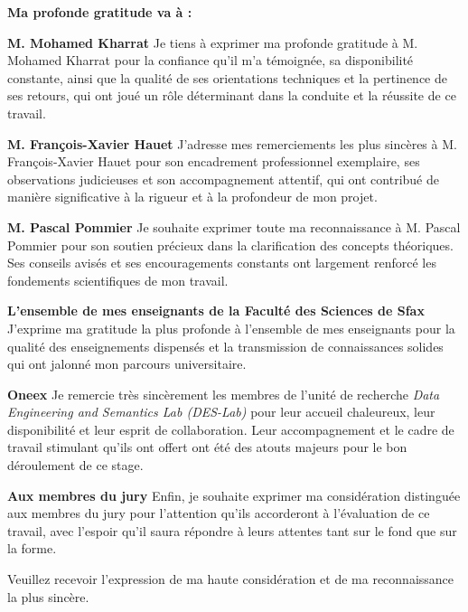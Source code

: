 \textbf{Ma profonde gratitude va à :}

\medskip

\textbf{M. Mohamed Kharrat}
Je tiens à exprimer ma profonde gratitude à M. Mohamed Kharrat pour la confiance qu’il m’a témoignée, sa disponibilité constante, ainsi que la qualité de ses orientations techniques et la pertinence de ses retours, qui ont joué un rôle déterminant dans la conduite et la réussite de ce travail.

\medskip

\textbf{M. François-Xavier Hauet}
J’adresse mes remerciements les plus sincères à M. François-Xavier Hauet pour son encadrement professionnel exemplaire, ses observations judicieuses et son accompagnement attentif, qui ont contribué de manière significative à la rigueur et à la profondeur de mon projet.

\medskip

\textbf{M. Pascal Pommier}
Je souhaite exprimer toute ma reconnaissance à M. Pascal Pommier pour son soutien précieux dans la clarification des concepts théoriques. Ses conseils avisés et ses encouragements constants ont largement renforcé les fondements scientifiques de mon travail.

\medskip

\textbf{L’ensemble de mes enseignants de la Faculté des Sciences de Sfax}
J’exprime ma gratitude la plus profonde à l’ensemble de mes enseignants pour la qualité des enseignements dispensés et la transmission de connaissances solides qui ont jalonné mon parcours universitaire.

\medskip

\textbf{Oneex}
Je remercie très sincèrement les membres de l’unité de recherche \textit{Data Engineering and Semantics Lab (DES-Lab)} pour leur accueil chaleureux, leur disponibilité et leur esprit de collaboration. Leur accompagnement et le cadre de travail stimulant qu’ils ont offert ont été des atouts majeurs pour le bon déroulement de ce stage.

\medskip

\textbf{Aux membres du jury}
Enfin, je souhaite exprimer ma considération distinguée aux membres du jury pour l’attention qu’ils accorderont à l’évaluation de ce travail, avec l’espoir qu’il saura répondre à leurs attentes tant sur le fond que sur la forme.

Veuillez recevoir l’expression de ma haute considération et de ma reconnaissance la plus sincère.

